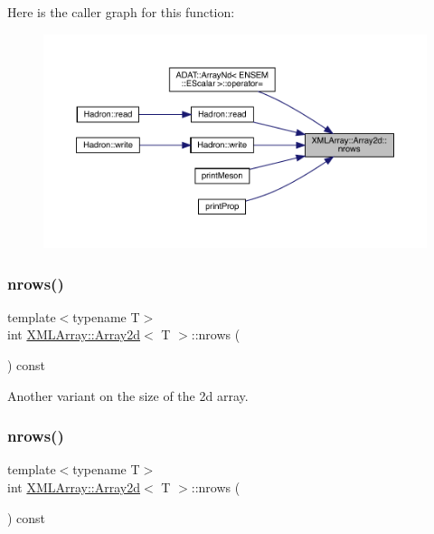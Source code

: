 Here is the caller graph for this function\+:
\nopagebreak
\begin{figure}[H]
\begin{center}
\leavevmode
\includegraphics[width=350pt]{dc/ddc/classXMLArray_1_1Array2d_a05ca0ef1e6fdbafb2c7cc575f9c3081c_icgraph}
\end{center}
\end{figure}
\mbox{\label{classXMLArray_1_1Array2d_a05ca0ef1e6fdbafb2c7cc575f9c3081c}} 
\subsubsection{\texorpdfstring{nrows()}{nrows()}\hspace{0.1cm}{\footnotesize\ttfamily [2/3]}}
{\footnotesize\ttfamily template$<$typename T$>$ \\
int \mbox{\hyperlink{classXMLArray_1_1Array2d}{X\+M\+L\+Array\+::\+Array2d}}$<$ T $>$\+::nrows (\begin{DoxyParamCaption}{ }\end{DoxyParamCaption}) const\hspace{0.3cm}{\ttfamily [inline]}}



Another variant on the size of the 2d array. 

\mbox{\label{classXMLArray_1_1Array2d_a05ca0ef1e6fdbafb2c7cc575f9c3081c}} 
\subsubsection{\texorpdfstring{nrows()}{nrows()}\hspace{0.1cm}{\footnotesize\ttfamily [3/3]}}
{\footnotesize\ttfamily template$<$typename T$>$ \\
int \mbox{\hyperlink{classXMLArray_1_1Array2d}{X\+M\+L\+Array\+::\+Array2d}}$<$ T $>$\+::nrows (\begin{DoxyParamCaption}{ }\end{DoxyParamCaption}) const\hspace{0.3cm}{\ttfamily [inline]}}



